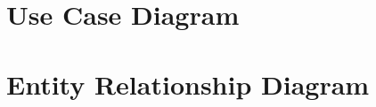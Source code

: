 \documentclass[11pt, a4paper]{article}
\begin{document}
		\section{Use Case Diagram}

	        \section{Entity Relationship Diagram}
			\centering
\end{document}
